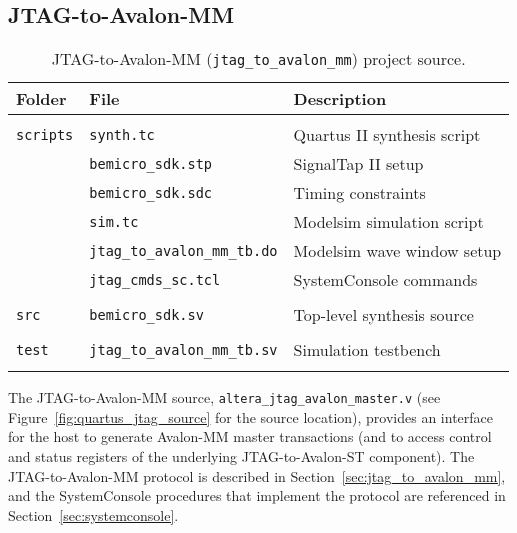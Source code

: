 \documentclass[10pt,twoside]{article}
\begin{document}
\clearpage
\subsection{JTAG-to-Avalon-MM}
%
\begin{table}[t]
\caption{JTAG-to-Avalon-MM ({\tt jtag\_to\_avalon\_mm}) project source.}
\label{tab:jtag_to_avalon_mm_source}
\begin{center}
\begin{tabular}{|l|l|p{6cm}|}
\hline
Folder & File & Description\\
\hline\hline
&&\\
\verb+scripts+ & \verb+synth.tc+         & Quartus II synthesis script\\
               & \verb+bemicro_sdk.stp+  & SignalTap II setup\\
               & \verb+bemicro_sdk.sdc+  & Timing constraints\\
               & \verb+sim.tc+           & Modelsim simulation script\\
               & \verb+jtag_to_avalon_mm_tb.do+  & Modelsim wave window setup\\
               & \verb+jtag_cmds_sc.tcl+ & SystemConsole commands\\
&&\\
\verb+src+     & \verb+bemicro_sdk.sv+   & Top-level synthesis source\\
&&\\
\verb+test+    & \verb+jtag_to_avalon_mm_tb.sv+ & Simulation testbench\\
&&\\
\hline
\end{tabular}
\end{center}
\end{table}

The JTAG-to-Avalon-MM source, \verb+altera_jtag_avalon_master.v+ (see 
Figure~\ref{fig:quartus_jtag_source} for the source location),
provides an interface for the host to generate Avalon-MM master
transactions (and to access control and status registers of the
underlying JTAG-to-Avalon-ST component).
The JTAG-to-Avalon-MM protocol is described in 
Section~\ref{sec:jtag_to_avalon_mm}, and the SystemConsole procedures
that implement the protocol are referenced in 
Section~\ref{sec:systemconsole}.
\end{document}
